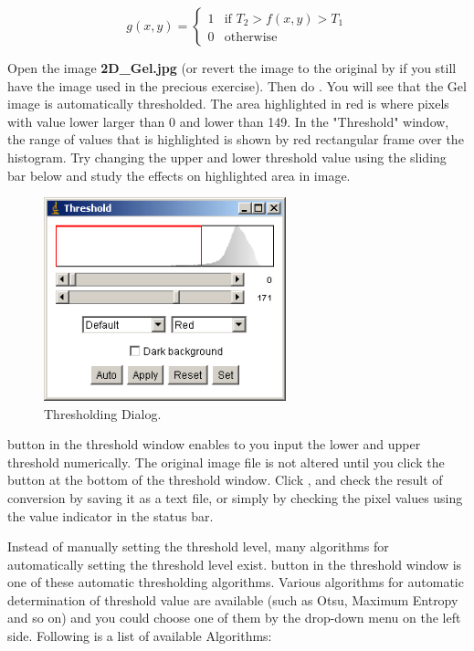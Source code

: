 \begin{equation}
g(x,y)= 
\begin{cases}
1 & \text{if $T_2 > f(x, y) > T_1$}\\
0 & \text{otherwise}
\end{cases}
\end{equation}

\begin{indentexercise}{2}
Open the image \textbf{2D\_Gel.jpg} (or
revert the image to the original by  if you still have the image used in the precious exercise).
Then do . 
You will see that the Gel image is automatically
thresholded. The area highlighted in red is where pixels with value
lower larger than 0 and lower than 149. In the
"Threshold" window, the range of values that is highlighted is shown by red rectangular frame over the
histogram. Try changing the upper and lower threshold value using the
sliding bar below and study the effects on highlighted area in image. 

\begin{figure}[htbp]
\begin{center}
\includegraphics[width=7cm]{fig/CMCIBasicCourse201102-img107.png}
\caption{ Thresholding Dialog.}
\label{fig:img107}
\end{center}
\end{figure}

 button in the threshold
window enables to you input the lower and upper threshold numerically.
The original image file is not altered until you click the button
 at the bottom of the
threshold window. Click , and
check the result of conversion by saving it as a text file, or simply
by checking the pixel values using the value indicator in the status
bar. 
\end{indentexercise}

Instead of manually setting the threshold level, many algorithms for
automatically setting the threshold level exist.
 button in the threshold
window is one of these automatic thresholding algorithms. Various
algorithms for automatic determination of threshold value are available
(such as Otsu, Maximum Entropy and so on) and you could choose one of
them by the drop-down menu on the left side. Following is a list of
available Algorithms:


